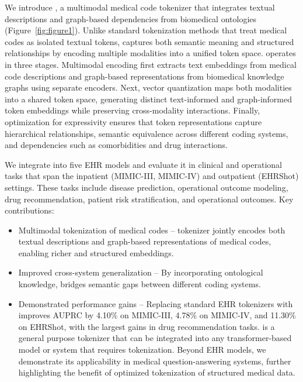 %
We introduce \model 
, a multimodal medical code tokenizer that integrates textual descriptions and graph-based dependencies from biomedical ontologies (Figure~\ref{fig:figure1}). Unlike standard tokenization methods that treat medical codes as isolated textual tokens, \model captures both semantic meaning and structured relationships by encoding multiple modalities into a unified token space. \model operates in three stages. Multimodal encoding first extracts text embeddings from medical code descriptions and graph-based representations from biomedical knowledge graphs using separate encoders. Next, vector quantization maps both modalities into a shared token space, generating distinct text-informed and graph-informed token embeddings while preserving cross-modality interactions. Finally, optimization for expressivity ensures that token representations capture hierarchical relationships, semantic equivalence across different coding systems, and dependencies such as comorbidities and drug interactions.  

We integrate \model into five EHR models and evaluate it in clinical and operational tasks that span the inpatient (MIMIC-III, MIMIC-IV) and outpatient (EHRShot) settings. These tasks include disease prediction, operational outcome modeling, drug recommendation, patient risk stratification, and operational outcomes. Key contributions:  
%
\begin{itemize}[leftmargin=*,noitemsep,topsep=0pt]
\item Multimodal tokenization of medical codes -- \model tokenizer  jointly encodes both textual descriptions and graph-based representations of medical codes, enabling richer and structured embeddings.  
\item Improved cross-system generalization -- By incorporating ontological knowledge, \model bridges semantic gaps between different coding systems.  
\item Demonstrated performance gains -- Replacing standard EHR tokenizers with \model improves AUPRC by 4.10\% on MIMIC-III, 4.78\% on MIMIC-IV, and 11.30\% on EHRShot, with the largest gains in drug recommendation tasks. \model is a general purpose tokenizer that can be integrated into any transformer-based model or system that requires tokenization. Beyond EHR models, we demonstrate its applicability in medical question-answering systems, further highlighting the benefit of optimized tokenization of structured medical data.
\end{itemize}